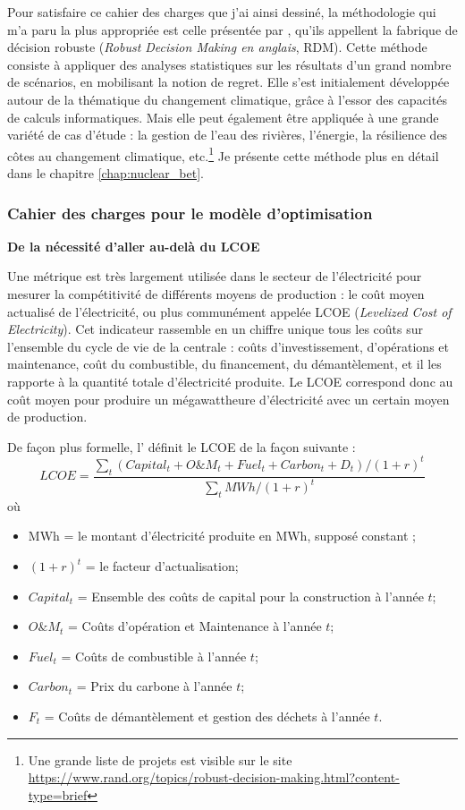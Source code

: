 Pour satisfaire ce cahier des charges que j’ai ainsi dessiné, la méthodologie qui m’a paru la plus appropriée est celle présentée par \citet{Lempert2006}, qu’ils appellent la fabrique de décision robuste (\textit{Robust Decision Making en anglais}, RDM). Cette méthode consiste à appliquer des analyses statistiques sur les résultats d’un grand nombre de scénarios, en mobilisant la notion de regret. Elle s’est initialement développée autour de la thématique du changement climatique, grâce à l’essor des capacités de calculs informatiques. Mais elle peut également être appliquée à une grande variété de cas d’étude : la gestion de l’eau des rivières, l’énergie, la résilience des côtes au changement climatique, etc.\footnote{Une grande liste de projets est visible sur le site \url{https://www.rand.org/topics/robust-decision-making.html?content-type=brief}} Je présente cette méthode plus en détail dans le chapitre \ref{chap:nuclear_bet}.
	
\subsubsection{Cahier des charges pour le modèle d’optimisation}

\textbf{De la nécessité d’aller au-delà du LCOE}

Une métrique est très largement utilisée dans le secteur de l’électricité pour mesurer la compétitivité de différents moyens de production : le coût moyen actualisé de l’électricité, ou plus communément appelée LCOE (\textit{Levelized Cost of Electricity}).
Cet indicateur rassemble en un chiffre unique tous les coûts sur l’ensemble du cycle de vie de la centrale : coûts d’investissement, d’opérations et maintenance, coût du combustible, du financement, du démantèlement, et il les rapporte à la quantité totale d’électricité produite. Le LCOE correspond donc au coût moyen pour produire un mégawattheure d’électricité avec un certain moyen de production.

De façon plus formelle, l'\citet{InternationalEnergyAgency2015} définit le LCOE de la façon suivante :
$$LCOE = \frac{\sum_t (Capital_t + O\&M_t + Fuel_t + Carbon_t + D_t) / (1+r)^t}{\sum_t MWh / (1+r)^t}$$
où
\begin{itemize}
	\item MWh = le montant d'électricité produite en MWh, supposé constant ;
	\item $(1+r)^t$ = le facteur d'actualisation;
	\item $Capital_t$ = Ensemble des coûts de capital pour la construction à l'année $t$;
	\item $O\&M_t$ = Coûts d'opération et Maintenance à l'année $t$;
	\item $Fuel_t$ = Coûts de combustible à l'année $t$;
	\item $Carbon_t$ = Prix du carbone à l'année $t$;
	\item $F_t$ = Coûts de démantèlement et gestion des déchets à l'année $t$.
\end{itemize}


